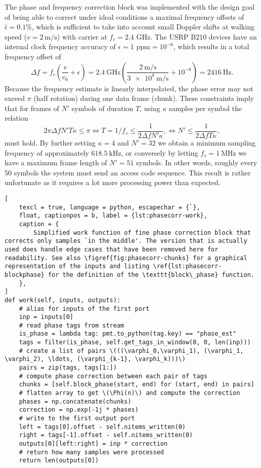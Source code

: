 The phase and frequency correction block was implemented with the design goal of being able to correct under ideal conditions a maximal frequency offsets of \(\hat{\epsilon} = 0.1\%\), which is sufficient to take into account small Doppler shifts at walking speed (\(v = \SI{2}{\meter\per\second}\)) with carrier at \(f_c = 2.4\) GHz. The USRP B210 devices have an internal clock frequency accuracy of \(\epsilon = 1\text{ ppm} = 10^{-6}\), which results in a total frequency offset of
\begin{equation}
	\Delta f = f_c \left( \frac{v}{c_0} + \epsilon \right)
	= \SI{2.4}{\giga\hertz} \left(
		\frac{\SI{2}{\meter\per\second}}{\SI{3e8}{\meter\per\second}} + 10^{-6} 
	\right) = \SI{2416}{\hertz}.
\end{equation}
Because the frequency estimate is linearly interpolated, the phase error may not exceed \(\pi\) (half rotation) during one data frame (chunk). These constraints imply that for frames of \(N'\) symbols of duration \(T\), using \(\kappa\) samples per symbol the relation
\begin{equation}\label{Doppler-shift}
	2\pi\Delta f N' T \kappa \leq \pi
	\iff T = 1/f_s \leq \frac{1}{2\Delta f N' \kappa},
	\iff N' \leq \frac{1}{2\Delta f T \kappa},
\end{equation}
must hold. By further setting \(\kappa = 4\) and \(N' = 32\) we obtain a minimum sampling frequency of approximately \(\SI{618.5}{\kilo\hertz}\), or conversely by letting \(f_s = \SI{1}{\mega\hertz}\) we have a maximum frame length of \(N' = 51\) symbols. In other words, roughly every 50 symbols the system must send an access code sequence. This result is rather unfortunate as it requires a lot more processing power than expected.

\begin{lstlisting}[
	texcl = true, language = python, escapechar = {`},
	float, captionpos = b, label = {lst:phasecorr-work},
	caption = {
		Simplified work function of fine phase correction block that corrects only samples `in the middle'. The version that is actually used does handle edge cases that have been removed here for readability. See also \figref{fig:phasecorr-chunks} for a graphical representation of the inputs and listing \ref{lst:phasecorr-blockphase} for the definition of the \texttt{block\_phase} function.
	},
]
def work(self, inputs, outputs):
	# alias for inputs of the first port
	inp = inputs[0]
	# read phase tags from stream
	is_phase = lambda tag: pmt.to_python(tag.key) == "phase_est"
	tags = filter(is_phase, self.get_tags_in_window(0, 0, len(inp)))
	# create a list of pairs \(((\varphi_0,\varphi_1), (\varphi_1, \varphi_2), \ldots, (\varphi_{k-1}, \varphi_k)))\)
	pairs = zip(tags, tags[1:])
	# compute phase correction between each pair of tags
	chunks = [self.block_phase(start, end) for (start, end) in pairs]
	# flatten array to get \(\Phi(n)\) and compute the correction
	phases = np.concatenate(chunks)
	correction = np.exp(-1j * phases) 
	# write to the first output port
	left = tags[0].offset - self.nitems_written(0)
	right = tags[-1].offset - self.nitems_written(0)
	outputs[0][left:right] = inp * correction
	# return how many samples were processed
	return len(outputs[0])
\end{lstlisting}

